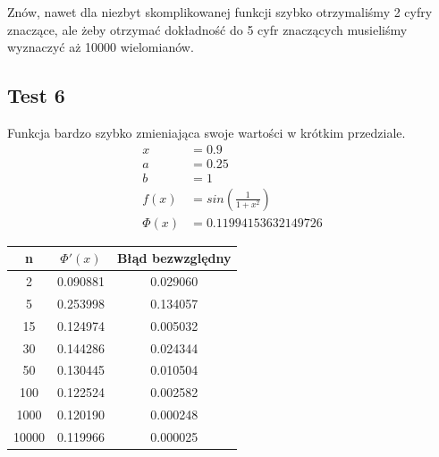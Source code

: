 \documentclass[a4paper]{article}
\begin{document}
   Znów, nawet dla niezbyt skomplikowanej funkcji szybko otrzymaliśmy 2 cyfry znaczące, ale żeby otrzymać dokładność do 5 cyfr znaczących
   musieliśmy wyznaczyć aż 10000 wielomianów.

\newpage
\subsection{Test 6}
    Funkcja bardzo szybko zmieniająca swoje wartości w krótkim przedziale.
    \[
        \begin{aligned}
            x &= 0.9 \\
            a & = 0.25 \\
            b &= 1 \\
            f(x) &= sin(\frac{1}{1 + x^2}) \\
            \Phi(x) &= 0.11994153632149726
        \end{aligned}
    \]

    \begin{center}
        \begin{tabular}{|c|c|c|} 
            \hline
            n & $\Phi'(x)$ & Błąd bezwzględny \\
            \hline
            2 & 0.090881 & 0.029060 \\
            \hline
            5 & 0.253998 & 0.134057 \\
            \hline
            15 & 0.124974 & 0.005032 \\
            \hline
            30 & 0.144286 & 0.024344 \\
            \hline
            50 & 0.130445 & 0.010504 \\
            \hline
            100 & 0.122524 & 0.002582 \\
            \hline
            1000 & 0.120190 & 0.000248 \\
            \hline
            10000 & 0.119966 & 0.000025 \\
            \hline
        \end{tabular}
    \end{center}
\end{document}
